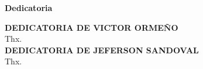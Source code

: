 \begin{center}
	{\large \bfseries  Dedicatoria}
\end{center}
\vspace{0.5cm}
\textbf{DEDICATORIA DE VICTOR ORMEÑO}
\\
Thx.
\\
\textbf{DEDICATORIA DE JEFERSON SANDOVAL}
\\
Thx.
\newline

